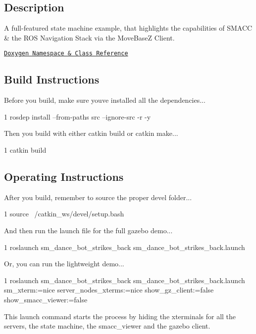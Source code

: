 

\subsection*{Description}

A full-\/featured state machine example, that highlights the capabilities of S\+M\+A\+CC \& the R\+OS Navigation Stack via the Move\+BaseZ Client.~\newline


\href{https://reelrbtx.github.io/SMACC_Documentation/master/html/namespacesm__dance__bot.html}{\tt Doxygen Namespace \& Class Reference}

\subsection*{Build Instructions}

Before you build, make sure you\textquotesingle{}ve installed all the dependencies...


\begin{DoxyCode}
1 rosdep install --from-paths src --ignore-src -r -y 
\end{DoxyCode}


Then you build with either catkin build or catkin make...


\begin{DoxyCode}
1 catkin build
\end{DoxyCode}
 \subsection*{Operating Instructions}

After you build, remember to source the proper devel folder...


\begin{DoxyCode}
1 source ~/catkin\_ws/devel/setup.bash
\end{DoxyCode}


And then run the launch file for the full gazebo demo...


\begin{DoxyCode}
1 roslaunch sm\_dance\_bot\_strikes\_back sm\_dance\_bot\_strikes\_back.launch
\end{DoxyCode}


Or, you can run the lightweight demo...


\begin{DoxyCode}
1 roslaunch sm\_dance\_bot\_strikes\_back sm\_dance\_bot\_strikes\_back.launch sm\_xterm:=nice
       server\_nodes\_xterms:=nice show\_gz\_client:=false show\_smacc\_viewer:=false
\end{DoxyCode}


This launch command starts the process by hiding the xterminals for all the servers, the state machine, the smacc\+\_\+viewer and the gazebo client. 